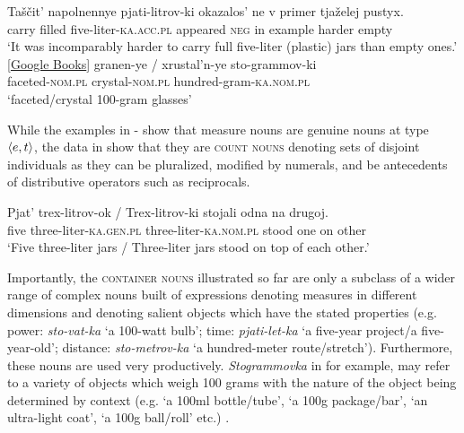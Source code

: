 \documentclass[output=paper,
colorlinks,
citecolor=brown,
newtxmath
]{langscibook}
\begin{document}
\ea\label{ex:3}
    \ea\label{ex:3a} \gll Taščit’ napolnennye pjati-litrov-ki okazalos’ ne v primer tjaželej pustyx.\\
    carry filled five-liter-\textsc{ka}.\textsc{acc.pl} appeared \textsc{neg} in example harder empty\\
    \glt `It was incomparably harder to carry full five-liter (plastic) jars than empty ones.' \hfill [\href{https://books.google.co.il/books?id=MeKhAAAAQBAJ&pg=PT111&lpg=PT111&dq=тащит+наполненные+пятилитровки&source}{Google Books}]
    \ex\label{ex:3b} \gll granen-ye {/} xrustal’n-ye sto-grammov-ki\\
    faceted-\textsc{nom.pl} {} crystal-\textsc{nom.pl} hundred-gram-\textsc{ka}.\textsc{nom.pl} \\
    \glt `faceted/crystal 100-gram glasses'
\z\z

\z

\noindent While the examples in - show that measure nouns are genuine nouns at type $\langle{e,t}\rangle$, the data in  show that they are \textsc{count nouns} denoting sets of disjoint individuals as they can be pluralized, modified by numerals, and be antecedents of distributive operators such as reciprocals.

\ea\label{ex:5} \gll Pjat’ trex-litrov-ok / Trex-litrov-ki stojali odna na drugoj.\\
five three-liter-\textsc{ka.gen.pl} {} three-liter-\textsc{ka.nom.pl} stood one on other\\
\glt `Five three-liter jars / Three-liter jars stood on top of each other.'
\z

\noindent Importantly, the \textsc{container nouns} illustrated so far are only a subclass of a wider range of complex nouns built of expressions denoting measures in different dimensions and denoting salient objects which have the stated properties (e.g. power: \textit{sto-vat-ka} `a 100-watt bulb'; time: \textit{pjati-let-ka} `a five-year project/a five-year-old'; distance: \textit{sto-metrov-ka} `a hundred-meter route/stretch'). Furthermore, these nouns are used very productively. \textit{Stogrammovka} in  for example, may refer to a variety of objects which weigh 100 grams with the nature of the object being determined by context (e.g. `a 100ml bottle/tube', `a 100g package/bar', `an ultra-light coat', `a 100g ball/roll' etc.) .
\end{document}
